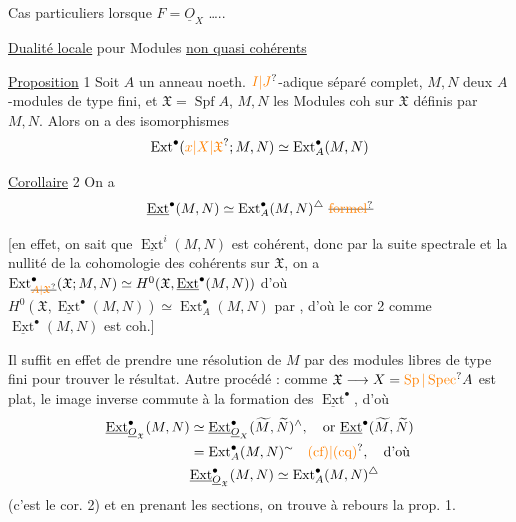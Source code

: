 Cas particuliers lorsque $F=\underline O_X$ \ldots..

\uline{Dualité locale} pour Modules \uline{non quasi cohérents}

\uline{Proposition} 1 \quad Soit $A$ un anneau noeth. $\unsure{I|J}$-adique séparé complet, $M$$,N$ deux $A$-modules de type fini, et $\mathfrak X=\operatorname{Spf} A$, $M,N$ les Modules coh sur $\mathfrak X$ définis par $M,N$. Alors on a des isomorphismes
\[
 \operatorname{Ext}^{\bullet}(\unsure{x|X|\mathfrak X};M,N)\simeq\operatorname{Ext}^{\bullet}_A(M,N)
\]

\uline{Corollaire} 2 \quad On a
\[
 \underline{\operatorname{Ext}}^{\bullet}(M,N)\simeq\operatorname{Ext}^{\bullet}_A(M,N)^{\triangle}\ \deleted{\unsure{\text{formel}}}
\]

[en effet, on sait que  $\underline{\operatorname{Ext}}^{i}(M,N)$ est cohérent, donc par la suite spectrale et la nullité de la cohomologie des cohérents sur $\mathfrak X$, on a $\operatorname{Ext}^{\bullet}_{\deleted{\unsure{A|\mathfrak X}}}(\mathfrak X;M,N)\simeq H^0(\mathfrak X,\underline{\operatorname{Ext}}^{\bullet}(M,N))$  d'où $H^0(\mathfrak X,\underline{\operatorname{Ext}}^{\bullet}(M,N))\simeq\operatorname{Ext}^{\bullet}_A(M,N)$ par , d'où le cor 2 comme $\underline{\operatorname{Ext}}^{\bullet}(M,N)$ est coh.]

Il suffit en effet de prendre une résolution  de $M$ par des modules libres de type fini pour trouver le résultat. Autre procédé : comme $\mathfrak X\longrightarrow X=\unsure{\operatorname{Sp}|\operatorname{Spec}} A$ est plat,  le  image inverse commute à la formation des $\underline{\operatorname{Ext}}^{\bullet}$, d'où
\[
\begin{aligned}
 \underline{\operatorname{Ext}}^{\bullet}_{\underline O_{\mathfrak X}}(M,N)
 &\simeq\underline{\operatorname{Ext}}^{\bullet}_{\underline O_X}(\widetilde M,\widetilde N)^{\wedge},\quad
 \text{or }\underline{\operatorname{Ext}}^{\bullet}(\widetilde M,\widetilde N)\\
 &=\operatorname{Ext}^{\bullet}_A(M,N)^{\sim}\quad\unsure{(\text{cf})|(\text{cq})},\quad\text{d'où}\\
 &\underline{\operatorname{Ext}}^{\bullet}_{\underline O_{\mathfrak X}}(M,N)\simeq\operatorname{Ext}^{\bullet}_A(M,N)^\triangle
\end{aligned}
\]
(c'est le cor. 2) et en prenant les sections, on trouve à rebours la prop. 1.

